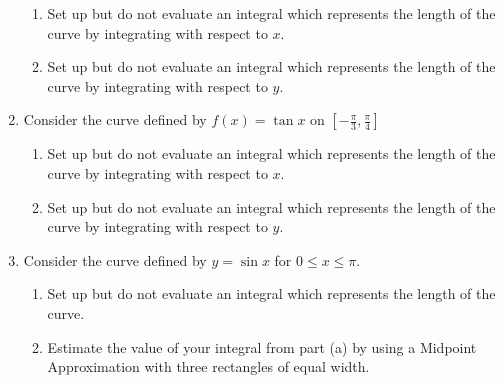 \documentclass[12pt]{article}
\newif\ifans
\begin{document}
\begin{enumerate}
\begin{enumerate}
\item Set up but do not evaluate an integral which represents the length of the curve by integrating with respect to $x$.

\ifans{\fbox{$L=\int_1^{e^3} \sqrt{1+\frac{1}{x^2}} \,dx$}} \fi

\item Set up but do not evaluate an integral which represents the length of the curve by integrating with respect to $y$.

\ifans{\fbox{$L=\int_0^3 \sqrt{1+e^{2y}} \,dy$}} \fi

\end{enumerate}

\item Consider the curve defined by $f(x)=\tan{x}$ on $\left[-\frac{\pi}{3},\frac{\pi}{4}\right]$

\begin{enumerate}

\item Set up but do not evaluate an integral which represents the length of the curve by integrating with respect to $x$.

\ifans{\fbox{$L=\int_{-\frac{\pi}{3}}^{\frac{\pi}{4}} \sqrt{1+\sec^4{x}} \,dx$}} \fi

\item Set up but do not evaluate an integral which represents the length of the curve by integrating with respect to $y$.

\ifans{\fbox{$L=\int_{-\sqrt{3}}^{1} \sqrt{1+\frac{1}{(1+y^2)^2}} \,dy$}} \fi

\end{enumerate}

\item Consider the curve defined by $y=\sin{x}$ for $0 \leq x \leq \pi$.

\begin{enumerate}

\item Set up but do not evaluate an integral which represents the length of the curve.

\ifans{\fbox{$\int_0^\pi \sqrt{1+\cos^2{x}} \,dx$}} \fi

\item Estimate the value of your integral from part (a) by using a Midpoint Approximation with three rectangles of equal width.


\end{enumerate}
\end{enumerate}
\end{document}
